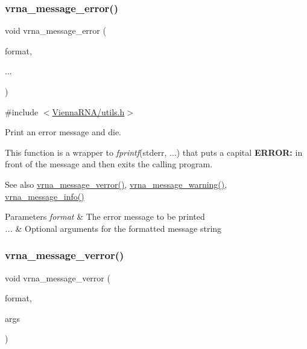 \subsubsection{\texorpdfstring{vrna\+\_\+message\+\_\+error()}{vrna\_message\_error()}}
{\footnotesize\ttfamily void vrna\+\_\+message\+\_\+error (\begin{DoxyParamCaption}\item[{const char $\ast$}]{format,  }\item[{}]{... }\end{DoxyParamCaption})}



{\ttfamily \#include $<$\mbox{\hyperlink{utils_8h}{Vienna\+R\+N\+A/utils.\+h}}$>$}



Print an error message and die. 

This function is a wrapper to {\itshape fprintf}(stderr, ...) that puts a capital {\bfseries E\+R\+R\+OR\+:} in front of the message and then exits the calling program.

\begin{DoxySeeAlso}{See also}
\mbox{\hyperlink{group__utils_gabc1a08dea0d84b5c33701732172a8b18}{vrna\+\_\+message\+\_\+verror()}}, \mbox{\hyperlink{group__utils_ga6e07ed24add60693ba886d54d0a46635}{vrna\+\_\+message\+\_\+warning()}}, \mbox{\hyperlink{group__utils_ga039bae6153a6415b054dbe6045f83d03}{vrna\+\_\+message\+\_\+info()}}
\end{DoxySeeAlso}

\begin{DoxyParams}{Parameters}
{\em format} & The error message to be printed \\
\hline
{\em ...} & Optional arguments for the formatted message string \\
\hline
\end{DoxyParams}
\mbox{\label{group__utils_gabc1a08dea0d84b5c33701732172a8b18}} 
\subsubsection{\texorpdfstring{vrna\+\_\+message\+\_\+verror()}{vrna\_message\_verror()}}
{\footnotesize\ttfamily void vrna\+\_\+message\+\_\+verror (\begin{DoxyParamCaption}\item[{const char $\ast$}]{format,  }\item[{va\+\_\+list}]{args }\end{DoxyParamCaption})}



